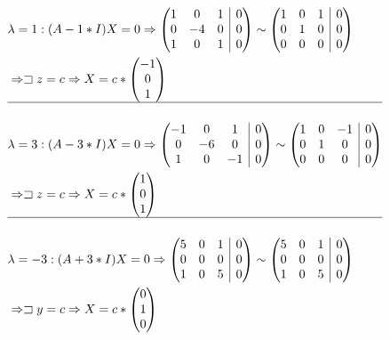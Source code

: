 \documentclass[12pt, a4paper]{article}
\begin{document}
\begin{equation*}
\begin{aligned}
&\lambda = 1: (A-1*I)X=0 \Rightarrow
\left(
\begin{array}{@{}ccc|c@{}}
1 & 0 & 1 & 0\\
0 & -4 & 0  & 0\\
1  & 0 & 1  & 0\\
\end{array}
\right) \sim 
\left(
\begin{array}{@{}ccc|c@{}}
1 & 0 & 1 & 0\\
0 & 1 & 0  & 0\\
0  & 0 & 0  & 0\\
\end{array}
\right)\\
& \Rightarrow \sqsupset z=c \Rightarrow X = c * \begin{pmatrix}
-1\\
0\\
1
\end{pmatrix}\\
\hline\\
&\lambda = 3: (A-3*I)X=0 \Rightarrow
\left(
\begin{array}{@{}ccc|c@{}}
-1 & 0 & 1 & 0\\
0 & -6 & 0  & 0\\
1  & 0 & -1  & 0\\
\end{array}
\right) \sim 
\left(
\begin{array}{@{}ccc|c@{}}
1 & 0 & -1 & 0\\
0 & 1 & 0  & 0\\
0  & 0 & 0  & 0\\
\end{array}
\right)\\
& \Rightarrow \sqsupset z=c \Rightarrow X = c * \begin{pmatrix}
1\\
0\\
1
\end{pmatrix}\\
\hline\\
&\lambda = -3: (A+3*I)X=0 \Rightarrow
\left(
\begin{array}{@{}ccc|c@{}}
5 & 0 & 1 & 0\\
0 & 0 & 0  & 0\\
1  & 0 & 5  & 0\\
\end{array}
\right) \sim 
\left(
\begin{array}{@{}ccc|c@{}}
5 & 0 & 1 & 0\\
0 & 0 & 0  & 0\\
1  & 0 & 5  & 0\\
\end{array}
\right)\\
& \Rightarrow \sqsupset y=c \Rightarrow X = c * \begin{pmatrix}
0\\
1\\
0
\end{pmatrix}\\
\end{aligned}
\end{equation*}
\end{document}
